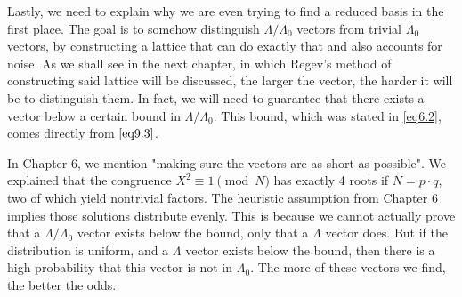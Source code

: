 Lastly, we need to explain why we are even trying to find a reduced basis in the first place. The goal is to somehow distinguish $\Lambda/\Lambda_0$ vectors from trivial $\Lambda_0$ vectors, by constructing a lattice that can do exactly that and also accounts for noise. As we shall see in the next chapter, in which Regev's method of constructing said lattice will be discussed, the larger the vector, the harder it will be to distinguish them. In fact, we will need to guarantee that there exists a vector below a certain bound in $\Lambda/\Lambda_0$. This bound, which was stated in \eqref{eq6.2}, comes directly from $\eqref{eq9.3}$. 

In Chapter 6, we mention "making sure the vectors are as short as possible". We explained that the congruence $X^2 \equiv 1 \pmod N$ has exactly 4 roots if $N = p\cdot q$, two of which yield nontrivial factors. The heuristic assumption from Chapter 6 implies those solutions distribute evenly. This is because we cannot actually prove that a $\Lambda/\Lambda_0$ vector exists below the bound, only that a $\Lambda$ vector does. But if the distribution is uniform, and a $\Lambda$ vector exists below the bound, then there is a high probability that this vector is not in $\Lambda_0$. The more of these vectors we find, the better the odds.



